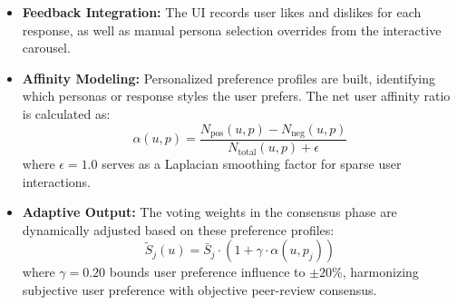 \begin{itemize}
    \item \textbf{Feedback Integration:} The UI records user likes and dislikes for each response, as well as manual persona selection overrides from the interactive carousel.
    
    \item \textbf{Affinity Modeling:} Personalized preference profiles are built, identifying which personas or response styles the user prefers. The net user affinity ratio is calculated as:
    \begin{equation}
    \alpha(u, p) = \frac{N_{\text{pos}}(u, p) - N_{\text{neg}}(u, p)}{N_{\text{total}}(u, p) + \epsilon}
    \end{equation}
    where $\epsilon = 1.0$ serves as a Laplacian smoothing factor for sparse user interactions.
    
    \item \textbf{Adaptive Output:} The voting weights in the consensus phase are dynamically adjusted based on these preference profiles:
    \begin{equation}
    \tilde{S}_j(u) = \bar{S}_j \cdot \left( 1 + \gamma \cdot \alpha(u, p_j) \right)
    \end{equation}
    where $\gamma = 0.20$ bounds user preference influence to $\pm 20\%$, harmonizing subjective user preference with objective peer-review consensus.
\end{itemize}

